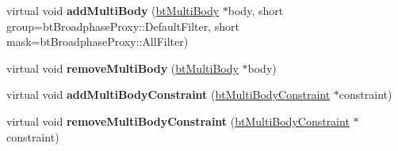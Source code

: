\begin{DoxyCompactItemize}
\item 
\mbox{\label{classbtMultiBodyDynamicsWorld_a60df3b04c9c7850a2a88a8de5a4d4521}} 
virtual void {\bfseries add\+Multi\+Body} (\hyperlink{classbtMultiBody}{bt\+Multi\+Body} $\ast$body, short group=bt\+Broadphase\+Proxy\+::\+Default\+Filter, short mask=bt\+Broadphase\+Proxy\+::\+All\+Filter)
\item 
\mbox{\label{classbtMultiBodyDynamicsWorld_af6aa04c06d7bea3001a9f7825e5628ab}} 
virtual void {\bfseries remove\+Multi\+Body} (\hyperlink{classbtMultiBody}{bt\+Multi\+Body} $\ast$body)
\item 
\mbox{\label{classbtMultiBodyDynamicsWorld_a2e180c423f5adedbc522651f423b2ded}} 
virtual void {\bfseries add\+Multi\+Body\+Constraint} (\hyperlink{classbtMultiBodyConstraint}{bt\+Multi\+Body\+Constraint} $\ast$constraint)
\item 
\mbox{\label{classbtMultiBodyDynamicsWorld_a0cb6ef18d19f6e1a353239e88f32b2b6}} 
virtual void {\bfseries remove\+Multi\+Body\+Constraint} (\hyperlink{classbtMultiBodyConstraint}{bt\+Multi\+Body\+Constraint} $\ast$constraint)
\end{DoxyCompactItemize}
